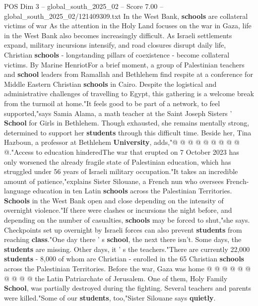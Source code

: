 \begin{textsample}{POS Dim 3 – global\_south\_2025\_02 – Score 7.00 – global\_south\_2025\_02/121409309.txt}  \label{ex:f3_pos_440}
In the West Bank, \textbf{schools} are collateral victims of war As the attention in the Holy Land focuses on the war in Gaza, life in the West Bank also becomes increasingly difficult.
As Israeli settlements expand, military incursions intensify, and road closures disrupt daily life, Christian \textbf{schools} - longstanding pillars of coexistence - become collateral victims.
By Marine HenriotFor a brief moment, a group of Palestinian teachers and \textbf{school} leaders from Ramallah and Bethlehem find respite at a conference for Middle Eastern Christian \textbf{schools} in Cairo.
Despite the logistical and administrative challenges of travelling to Egypt, this gathering is a welcome break from the turmoil at home."It feels good to be part of a network, to feel supported,"says Samia Alama, a math teacher at the Saint Joseph Sisters ' \textbf{School} for Girls in Bethlehem.
Though exhausted, she remains mentally strong, determined to support her \textbf{students} through this difficult time.
Beside her, Tina Hazboun, a professor at Bethlehem \textbf{University}, adds,"@ @ @ @ @ @ @ @ @ @."Access to education hinderedThe war that erupted on 7 October 2023 has only worsened the already fragile state of Palestinian education, which has struggled under 56 years of Israeli military occupation."It takes an incredible amount of patience,"explains Sister Silouane, a French nun who oversees French-language education in ten Latin \textbf{schools} across the Palestinian Territories. \textbf{Schools} in the West Bank open and close depending on the intensity of overnight violence."If there were clashes or incursions the night before, and depending on the number of casualties, \textbf{schools} may be forced to shut,"she says.
Checkpoints set up overnight by Israeli forces can also prevent \textbf{students} from reaching \textbf{class}."One day there ' s \textbf{school}, the next there isn't.
Some days, the \textbf{students} are missing.
Other days, it ' s the teachers."There are currently 22,000 \textbf{students} - 8,000 of whom are Christian - enrolled in the 65 Christian \textbf{schools} across the Palestinian Territories.
Before the war, Gaza was home @ @ @ @ @ @ @ @ @ @ the Latin Patriarchate of Jerusalem.
One of them, Holy Family \textbf{School}, was partially destroyed during the fighting.
Several teachers and parents were killed."Some of our \textbf{students}, too,"Sister Silouane says \textbf{quietly}.

\end{textsample}
